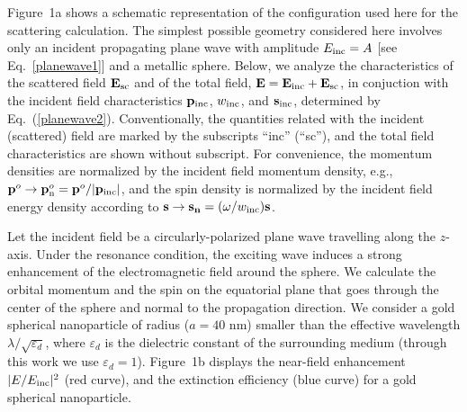 \documentclass[journal=apchd5,manuscript=article]{achemso}
\begin{document}
Figure~1a shows a schematic representation of the configuration used here for the scattering calculation. The simplest possible geometry considered here involves only an incident propagating plane wave with amplitude $E_{\rm inc} = A$ [see Eq.~\ref{planewave1}] and a metallic sphere. 
Below, we analyze the characteristics of the scattered field ${\bf E}_{\rm sc}$ and of the total field, ${\bf E} = {\bf E}_{\rm inc} + {\bf E}_{\rm sc}$, in conjuction with the incident field characteristics ${\bf p}_{\rm inc}$, $w_{\rm inc}$, and ${\bf s}_{\rm inc}$, determined by Eq.~(\ref{planewave2}). Conventionally, the quantities related with the incident (scattered) field are marked by the subscripts ``inc'' (``sc''), and the total field characteristics are shown without subscript. For convenience, the momentum densities are normalized by the incident field momentum density, e.g., 
${\bf p}^o \to {\bf p}_{\rm n}^o = {\bf p}^o  / |{\bf p}_{\rm inc}|$, and the spin density is normalized by the incident field energy density according to  ${\bf s} \to {\bf s}_{\bf n} = (\omega / w_{\rm inc}) {\bf s}$.

Let the incident field be a circularly-polarized plane wave travelling along the $z$-axis. Under the resonance condition, the exciting wave induces a strong enhancement of the electromagnetic field around the sphere. We calculate the orbital momentum and the spin on the equatorial plane that goes through the center of the sphere and normal to the propagation direction. We consider a gold spherical nanoparticle of radius ($a=40$ nm) smaller than the effective wavelength $\lambda/\sqrt{\varepsilon_d}$, where $\varepsilon_d$ is the dielectric constant of the surrounding medium (through this work we use $\varepsilon_d =1$). Figure~1b displays the near-field enhancement $|E/E_{\rm inc}|^2$ (red curve),  and the extinction efficiency (blue curve) for a gold spherical nanoparticle.


\end{document}
